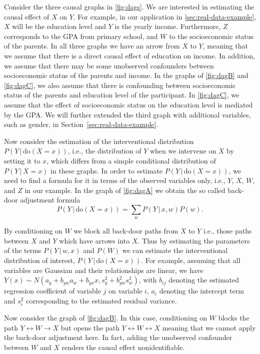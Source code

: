 \documentclass[11pt,a4paper,twoside]{article}
\newcommand{\+}[1]{\ensuremath{\mathbf{#1}}}
\newcommand{\po}[2]{#1(#2)}
\newcommand{\doo}{\textrm{do}}
\newcommand{\given}{{ \, | \, }}
\begin{document}
	Consider the three causal graphs in \autoref{fig:dags}. We are interested in estimating the causal effect of $X$ on $Y$. For example, in our application in \autoref{sec:real-data-example}, $X$ will be the education level and $Y$ is the yearly income. Furthermore, $Z$ corresponds to the GPA from primary school, and $W$ to the socioeconomic status of the parents. In all three graphs we have an arrow from $X$ to $Y$, meaning that we assume that there is a direct causal effect of education on income. In addition, we assume that there may be some unobserved confounders between socioeconomic status of the parents and income. In the graphs of \autoref{fig:dagB} and \autoref{fig:dagC}, we also assume that there is confounding between socioeconomic status of the parents and education level of the participant. In \autoref{fig:dagC}, we assume that the effect of socioeconomic status on the education level is mediated by  the GPA. We will further extended the third graph with additional variables, such as gender, in Section~\ref{sec:real-data-example}.
	
	Now consider the estimation of the interventional distribution $P(Y \given \doo(X = x))$, i.e., the distribution of $Y$ when we intervene on $X$ by setting it to $x$, which differs from a simple conditional distribution of $P(Y \given X = x)$ in these graphs. In order to estimate $P(Y \given \doo(X = x))$, we need to find a formula for it in terms of the observed variables only, i.e., $Y$, $X$, $W$, and $Z$ in our example. In the graph of \autoref{fig:dagA} we obtain the so called back-door adjustment formula
	\begin{equation*}
	P(Y \given \doo(X = x)) = \sum_{w}P(Y\given x, w)P(w).
	\end{equation*}
	
	By conditioning on $W$ we block all back-door paths from $X$ to $Y$ i.e., those paths between $X$ and $Y$ which have arrows into $X$. Thus by estimating the parameters of the terms $P(Y \given w, x)$ and $P(W)$ we can estimate the interventional distribution of interest, $P(Y \given \doo(X = x))$. For example, assuming that all variables are Gaussian and their relationships are linear, we have $\po{Y}{x} \sim N(a_y + b_{yw} a_w + b_{yx} x, s^2_y + b_{yw}^2 s^2_w)$, with $b_{ij}$ denoting the estimated regression coefficient of variable $j$ on variable $i$, $a_i$ denoting the intercept term and $s^2_i$ corresponding to the estimated residual variance.
	
	Now consider the graph of \autoref{fig:dagB}. In this case, conditioning on $W$ blocks the path $Y \longleftrightarrow W \longrightarrow X$ but opens the path $Y \longleftrightarrow  W \longleftrightarrow X$ meaning that we cannot apply the back-door adjustment here. In fact, adding the unobserved confounder between $W$ and $X$ renders the causal effect nonidentifiable.
	
\end{document}
